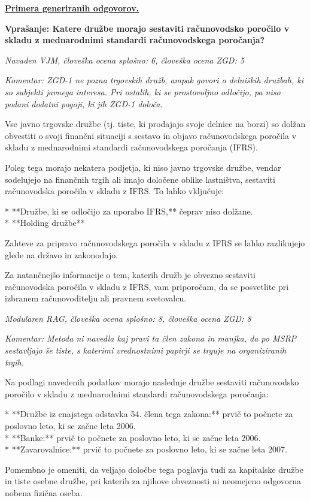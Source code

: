 \documentclass[a4paper,12pt,openright]{book}
\begin{document}
\underline{\textbf{Primera generiranih odgovorov.}}

\textbf{Vprašanje: Katere družbe morajo sestaviti računovodsko poročilo v skladu z mednarodnimi standardi računovodskega poročanja?}

\textit{Navaden VJM, človeška ocena splošno: 6, človeška ocena ZGD: 5}

\textit{Komentar: ZGD-1 ne pozna trgovskih družb, ampak govori o delniških družbah, ki so subjekti javnega interesa. Pri ostalih, ki se prostovoljno odločijo, pa niso podani dodatni pogoji, ki jih ZGD-1 določa.}

\begin{mdframed}[linewidth=1pt]
	\raggedright
	\ttfamily
	Vse javno trgovske družbe (tj. tiste, ki prodajajo svoje delnice na borzi) so dolžan obvestiti o svoji finančni situaciji s sestavo in objavo računovodskega poročila v skladu z mednarodnimi standardi računovodskega poročanja (IFRS).

	Poleg tega morajo nekatera podjetja, ki niso javno trgovske družbe, vendar sodelujejo na finančnih trgih ali imajo določene oblike lastništva, sestaviti računovodska poročila v skladu z IFRS. To lahko vključuje:

	* **Družbe, ki se odločijo za uporabo IFRS,** čeprav niso dolžane. \\
	* **Holding družbe**

	Zahteve za pripravo računovodskega poročila v skladu z IFRS se lahko razlikujejo glede na državo in zakonodajo.


	Za natančnejšo informacije o tem, katerih družb je obvezno sestaviti računovodska poročila v skladu z IFRS, vam priporočam, da se posvetlite pri izbranem računovoditelju ali pravnem svetovalcu.

\end{mdframed}

\textit{Modularen RAG, človeška ocena splošno: 8, človeška ocena ZGD: 8}

\textit{Komentar: Metoda ni navedla kaj pravi ta člen zakona in manjka, da po MSRP sestavljajo še tiste, s katerimi vrednostnimi papirji se trguje na organiziranih trgih.}

\begin{mdframed}[linewidth=1pt]
	\raggedright
	\ttfamily
	Na podlagi navedenih podatkov morajo naslednje družbe sestaviti računovodsko poročilo v skladu z mednarodnimi standardi računovodskega poročanja:

	* **Družbe iz enajstega odstavka 54. člena tega zakona:**  prvič to počnete za poslovno leto, ki se začne leta 2006. \\
	* **Banke:** prvič to počnete za poslovno leto, ki se začne leta 2006. \\
	* **Zavarovalnice:** prvič to počnete za poslovno leto, ki se začne leta 2007.

	Pomembno je omeniti, da veljajo določbe tega poglavja tudi za kapitalske družbe in tiste osebne družbe, pri katerih za njihove obveznosti ni neomejeno odgovorna nobena fizična oseba.

\end{mdframed}
\end{document}
